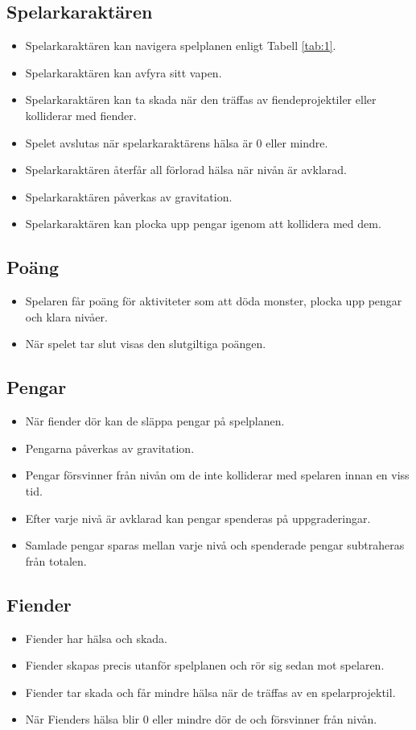 \documentclass{TDP005mall}
\begin{document}
\subsection{Spelarkaraktären}
\begin{itemize}
\item Spelarkaraktären kan navigera spelplanen enligt Tabell \ref{tab:1}.
\item Spelarkaraktären kan avfyra sitt vapen.
\item Spelarkaraktären kan ta skada när den träffas av fiendeprojektiler eller kolliderar med fiender.
\item Spelet avslutas när spelarkaraktärens hälsa är 0 eller mindre.
\item Spelarkaraktären återfår all förlorad hälsa när nivån är avklarad.
\item Spelarkaraktären påverkas av gravitation.
\item Spelarkaraktären kan plocka upp pengar igenom att kollidera med dem.
\end{itemize}

\subsection{Poäng}
\begin{itemize}
\item Spelaren får poäng för aktiviteter som att döda  monster, plocka upp pengar och klara nivåer.
\item När spelet tar slut visas den slutgiltiga poängen.
\end{itemize}

\subsection{Pengar}
\begin{itemize}
\item När fiender dör kan de släppa pengar på spelplanen.
\item Pengarna påverkas av gravitation.
\item Pengar försvinner från nivån om de inte kolliderar med spelaren innan en viss tid.
\item Efter varje nivå är avklarad kan pengar spenderas på uppgraderingar.
\item Samlade pengar sparas mellan varje nivå och spenderade pengar subtraheras från totalen. 
\end{itemize}

\subsection{Fiender}
\begin{itemize}
\item Fiender har hälsa och skada.
\item Fiender skapas precis utanför spelplanen och rör sig sedan mot spelaren.
\item Fiender tar skada och får mindre hälsa när de träffas av en spelarprojektil.
\item När Fienders hälsa blir 0 eller mindre dör de och försvinner från nivån.
\end{itemize}
\end{document}
